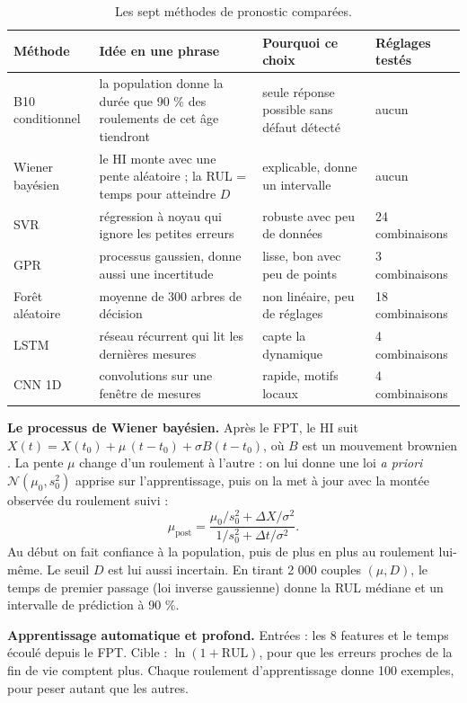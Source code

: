 \begin{table}[H]
\centering\small
\setlength{\tabcolsep}{4pt}
\begin{tabularx}{\linewidth}{lYYl}
\toprule
Méthode & Idée en une phrase & Pourquoi ce choix & Réglages testés \\
\midrule
B10 conditionnel & la population donne la durée que 90 \% des roulements de cet âge tiendront & seule réponse possible sans défaut détecté & aucun \\
Wiener bayésien & le HI monte avec une pente aléatoire ; la RUL = temps pour atteindre $D$ & explicable, donne un intervalle & aucun \\
SVR & régression à noyau qui ignore les petites erreurs & robuste avec peu de données & 24 combinaisons \\
GPR & processus gaussien, donne aussi une incertitude & lisse, bon avec peu de points & 3 combinaisons \\
Forêt aléatoire & moyenne de 300 arbres de décision & non linéaire, peu de réglages & 18 combinaisons \\
LSTM & réseau récurrent qui lit les dernières mesures & capte la dynamique & 4 combinaisons \\
CNN 1D & convolutions sur une fenêtre de mesures & rapide, motifs locaux & 4 combinaisons \\
\bottomrule
\end{tabularx}
\caption[Les sept méthodes de pronostic]{Les sept méthodes de pronostic comparées.}
\label{tab:methodes}
\end{table}

\textbf{Le processus de Wiener bayésien.} Après le FPT, le HI suit $X(t) = X(t_0) + \mu\,(t - t_0) + \sigma B(t - t_0)$, où $B$ est un mouvement brownien \cite{si2011,zhang2018}. La pente $\mu$ change d'un roulement à l'autre : on lui donne une loi \emph{a priori} $\mathcal{N}(\mu_0, s_0^2)$ apprise sur l'apprentissage, puis on la met à jour avec la montée observée du roulement suivi :
\begin{equation}
\mu_{\text{post}} = \frac{\mu_0/s_0^2 + \Delta X/\sigma^2}{1/s_0^2 + \Delta t/\sigma^2}.
\end{equation}
Au début on fait confiance à la population, puis de plus en plus au roulement lui-même. Le seuil $D$ est lui aussi incertain. En tirant 2 000 couples $(\mu, D)$, le temps de premier passage (loi inverse gaussienne) donne la RUL médiane et un intervalle de prédiction à 90 \%.

\textbf{Apprentissage automatique et profond.} Entrées : les 8 features et le temps écoulé depuis le FPT. Cible : $\ln(1 + \text{RUL})$, pour que les erreurs proches de la fin de vie comptent plus. Chaque roulement d'apprentissage donne 100 exemples, pour peser autant que les autres.

